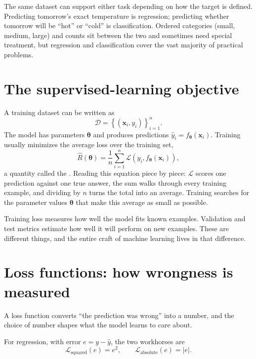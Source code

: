 The same dataset can support either task depending on how the target is defined. Predicting tomorrow's exact temperature is regression; predicting whether tomorrow will be ``hot'' or ``cold'' is classification. Ordered categories (small, medium, large) and counts sit between the two and sometimes need special treatment, but regression and classification cover the vast majority of practical problems.

\section{The supervised-learning objective}

A training dataset can be written as
\[
  \mathcal{D}={\left\{(\bm{x}_i,y_i)\right\}}_{i=1}^{n}.
\]
The model has parameters $\bm{\theta}$ and produces predictions $\hat{y}_i=f_{\bm{\theta}}(\bm{x}_i)$. Training usually minimizes the average loss over the training set,
\[
  \hat{R}(\bm{\theta})
  =\frac{1}{n}\sum_{i=1}^{n}
  \mathcal{L}\!\left(y_i,f_{\bm{\theta}}(\bm{x}_i)\right),
\]
a quantity called the . Reading this equation piece by piece: $\mathcal{L}$ scores one prediction against one true answer, the sum walks through every training example, and dividing by $n$ turns the total into an average. Training searches for the parameter values $\bm{\theta}$ that make this average as small as possible.

\begin{keyidea}
Training loss measures how well the model fits known examples. Validation and test metrics estimate how well it will perform on new examples. These are different things, and the entire craft of machine learning lives in that difference.
\end{keyidea}

\section{Loss functions: how wrongness is measured}

A loss function converts ``the prediction was wrong'' into a number, and the choice of number shapes what the model learns to care about.

For regression, with error $e=y-\hat{y}$, the two workhorses are
\[
  \mathcal{L}_{\text{squared}}(e)=e^2,
  \qquad
  \mathcal{L}_{\text{absolute}}(e)=|e|.
\]

\begin{mlfigure}
\end{mlfigure}

